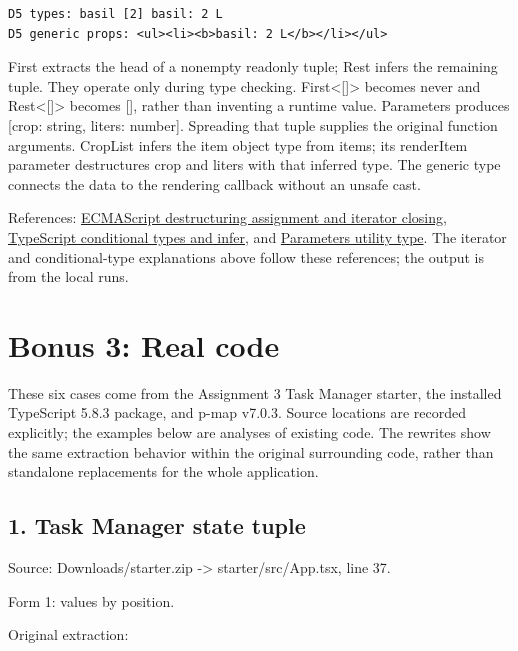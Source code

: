 \documentclass[
  10pt,
  a4paper,
]{article}
\newcounter{none} %
\begin{document}
\begin{lstlisting}
D5 types: basil [2] basil: 2 L
D5 generic props: <ul><li><b>basil: 2 L</b></li></ul>
\end{lstlisting}

First extracts the head of a nonempty readonly tuple; Rest infers the
remaining tuple. They operate only during type checking.
First\textless{[}{]}\textgreater{} becomes never and
Rest\textless{[}{]}\textgreater{} becomes {[}{]}, rather than inventing
a runtime value. Parameters produces {[}crop: string, liters: number{]}.
Spreading that tuple supplies the original function arguments. CropList
infers the item object type from items; its renderItem parameter
destructures crop and liters with that inferred type. The generic type
connects the data to the rendering callback without an unsafe cast.

References:
\href{https://tc39.es/ecma262/2024/multipage/ecmascript-language-expressions.html\#sec-destructuring-assignment}{ECMAScript
destructuring assignment and iterator closing},
\href{https://www.typescriptlang.org/docs/handbook/2/conditional-types.html}{TypeScript
conditional types and infer}, and
\href{https://www.typescriptlang.org/docs/handbook/utility-types.html\#parameterstype}{Parameters
utility type}. The iterator and conditional-type explanations above
follow these references; the output is from the local runs.

\section{Bonus 3: Real code}\label{bonus-3-real-code}

These six cases come from the Assignment 3 Task Manager starter, the
installed TypeScript 5.8.3 package, and p-map v7.0.3. Source locations
are recorded explicitly; the examples below are analyses of existing
code. The rewrites show the same extraction behavior within the original
surrounding code, rather than standalone replacements for the whole
application.

\subsection{1. Task Manager state
tuple}\label{1-task-manager-state-tuple}

Source: Downloads/starter.zip -\textgreater{} starter/src/App.tsx, line
37.

Form 1: values by position.

Original extraction:
\end{document}
